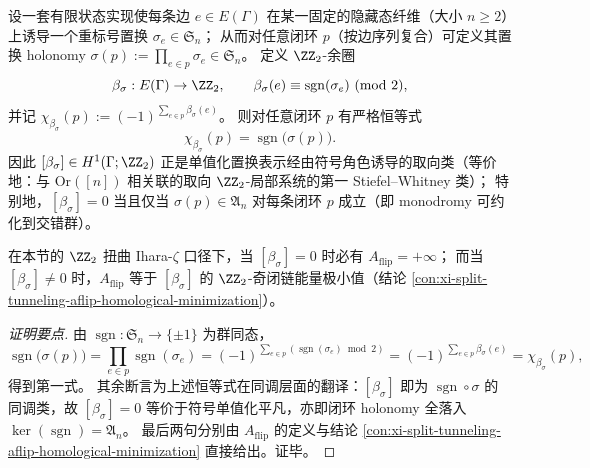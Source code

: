 \begin{conclusion}\label{con:xi-split-beta-sign-orientation-w1}
设一套有限状态实现使每条边 \(e\in E(\Gamma)\) 在某一固定的隐藏态纤维（大小 \(n\ge 2\)）上诱导一个重标号置换 \(\sigma_e\in \mathfrak S_n\)；
从而对任意闭环 \(p\)（按边序列复合）可定义其置换 holonomy
\(
\sigma(p):=\prod_{e\in p}\sigma_e\in\mathfrak S_n
\)。
定义 \(\ZZ_2\)-余圈
\[
\beta_{\sigma}:E(\Gamma)\to\ZZ_2,\qquad
\beta_{\sigma}(e)\equiv \operatorname{sgn}(\sigma_e)\ (\mathrm{mod}\ 2),
\]
并记 \(\chi_{\beta_\sigma}(p):=(-1)^{\sum_{e\in p}\beta_\sigma(e)}\)。
则对任意闭环 \(p\) 有严格恒等式
\[
\chi_{\beta_\sigma}(p)=\operatorname{sgn}\!\bigl(\sigma(p)\bigr).
\]
因此 \([\beta_\sigma]\in H^1(\Gamma;\ZZ_2)\) 正是单值化置换表示经由符号角色诱导的取向类（等价地：与 \(\mathrm{Or}([n])\) 相关联的取向 \(\ZZ_2\)-局部系统的第一 Stiefel--Whitney 类）；
特别地，\([\beta_\sigma]=0\) 当且仅当 \(\sigma(p)\in\mathfrak A_n\) 对每条闭环 \(p\) 成立（即 monodromy 可约化到交错群）。
\par
在本节的 \(\ZZ_2\) 扭曲 Ihara-\(\zeta\) 口径下，当 \([\beta_\sigma]=0\) 时必有 \(A_{\mathrm{flip}}=+\infty\)；
而当 \([\beta_\sigma]\neq 0\) 时，\(A_{\mathrm{flip}}\) 等于 \([\beta_\sigma]\) 的 \(\ZZ_2\)-奇闭链能量极小值（结论 \ref{con:xi-split-tunneling-aflip-homological-minimization}）。
\end{conclusion}
\begin{proof}[证明要点]
由 \(\operatorname{sgn}:\mathfrak S_n\to\{\pm1\}\) 为群同态，
\[
\operatorname{sgn}\!\bigl(\sigma(p)\bigr)
=\prod_{e\in p}\operatorname{sgn}(\sigma_e)
=(-1)^{\sum_{e\in p}(\operatorname{sgn}(\sigma_e)\bmod 2)}
=(-1)^{\sum_{e\in p}\beta_\sigma(e)}
=\chi_{\beta_\sigma}(p),
\]
得到第一式。
其余断言为上述恒等式在同调层面的翻译：\([\beta_\sigma]\) 即为 \(\operatorname{sgn}\circ\sigma\) 的同调类，故 \([\beta_\sigma]=0\) 等价于符号单值化平凡，亦即闭环 holonomy 全落入 \(\ker(\operatorname{sgn})=\mathfrak A_n\)。
最后两句分别由 \(A_{\mathrm{flip}}\) 的定义与结论 \ref{con:xi-split-tunneling-aflip-homological-minimization} 直接给出。证毕。
\end{proof}



